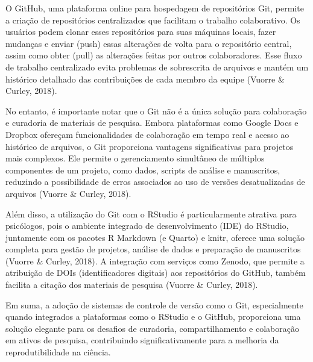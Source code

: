 \documentclass[
  a4paper,
]{book}
\begin{document}
\begin{tcolorbox}
O GitHub, uma plataforma online para hospedagem de repositórios Git,
permite a criação de repositórios centralizados que facilitam o trabalho
colaborativo. Os usuários podem clonar esses repositórios para suas
máquinas locais, fazer mudanças e enviar (push) essas alterações de
volta para o repositório central, assim como obter (pull) as alterações
feitas por outros colaboradores. Esse fluxo de trabalho centralizado
evita problemas de sobrescrita de arquivos e mantém um histórico
detalhado das contribuições de cada membro da equipe (Vuorre \& Curley,
2018).\vspace{0.5em}

No entanto, é importante notar que o Git não é a única solução para
colaboração e curadoria de materiais de pesquisa. Embora plataformas
como Google Docs e Dropbox ofereçam funcionalidades de colaboração em
tempo real e acesso ao histórico de arquivos, o Git proporciona
vantagens significativas para projetos mais complexos. Ele permite o
gerenciamento simultâneo de múltiplos componentes de um projeto, como
dados, scripts de análise e manuscritos, reduzindo a possibilidade de
erros associados ao uso de versões desatualizadas de arquivos (Vuorre \&
Curley, 2018).\vspace{0.5em}

Além disso, a utilização do Git com o RStudio é particularmente atrativa
para psicólogos, pois o ambiente integrado de desenvolvimento (IDE) do
RStudio, juntamente com os pacotes R Markdown (e Quarto) e knitr,
oferece uma solução completa para gestão de projetos, análise de dados e
preparação de manuscritos (Vuorre \& Curley, 2018). A integração com
serviços como Zenodo, que permite a atribuição de DOIs (identificadores
digitais) aos repositórios do GitHub, também facilita a citação dos
materiais de pesquisa (Vuorre \& Curley, 2018).\vspace{0.5em}

Em suma, a adoção de sistemas de controle de versão como o Git,
especialmente quando integrados a plataformas como o RStudio e o GitHub,
proporciona uma solução elegante para os desafios de curadoria,
compartilhamento e colaboração em ativos de pesquisa, contribuindo
significativamente para a melhoria da reprodutibilidade na ciência.

\end{tcolorbox}
\end{document}
